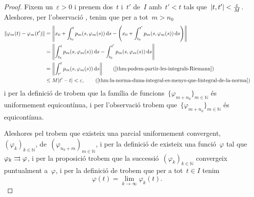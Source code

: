 \documentclass[../../main.tex]{subfiles}
\begin{document}
\begin{proof}
        Fixem un~\(\varepsilon>0\) i prenem dos~\(t\) i~\(t'\) de~\(I\) amb~\(t'<t\) tals que~\(\abs{t,t'}<\frac{\varepsilon}{M}\).
        Aleshores, per l'observació , tenim que per a tot~\(m>n_{0}\)
        \begin{align*}
            \norm{\varphi_{m}(t)-\varphi_{m}(t')}&=\norm{x_{0}+\int_{t_{0}}^{t}p_{m}(s,\varphi_{m}(s))\diff s-\Bigg(x_{0}+\int_{t_{0}}^{t'}p_{m}(s,\varphi_{m}(s))\diff s\Bigg)} \\
            &=\norm{\int_{t_{0}}^{t}p_{m}(s,\varphi_{m}(s))\diff s-\int_{t_{0}}^{t'}p_{m}(s,\varphi_{m}(s))\diff s} \\
            &=\norm{\int_{t'}^{t}p_{m}(s,\varphi_{m}(s))\diff s} \tag{\ref{thm:podem-partir-les-integrals-Riemann}} \\
            &\leq M\abs{t'-t}<\varepsilon, \tag{\ref{thm:la-norma-duna-integral-es-menys-que-lintegral-de-la-norma}}
        \end{align*}
        i per la definició de  trobem que la família de funcions~\(\{\varphi_{m+n_{0}}\}_{m\in\mathbb{N}}\) és uniformement equicontínua, i per l'observació  trobem que~\(\{\varphi_{m+n_{0}}\}_{m\in\mathbb{N}}\) és equicontínua.

        Aleshores pel  trobem que existeix una parcial uniformement convergent,~\((\varphi_{k})_{k\in\mathbb{N}}\), de~\((\varphi_{n_{0}+m})_{m\in\mathbb{N}}\), i per la definició de  existeix una funció~\(\varphi\) tal que~\(\varphi_{k}\mathrel{\rightrightarrows}\varphi\), i per la proposició  trobem que la successió~\((\varphi_{k})_{k\in\mathbb{N}}\) convergeix puntualment a~\(\varphi\), i per la definició de  trobem que per a tot~\(t\in I\) tenim
        \begin{equation}
            \label{thm:Teorema-de-Peano:eq1}
            \varphi(t)=\lim_{k\to\infty}\varphi_{k}(t).
        \end{equation}


\end{proof}
\end{document}
